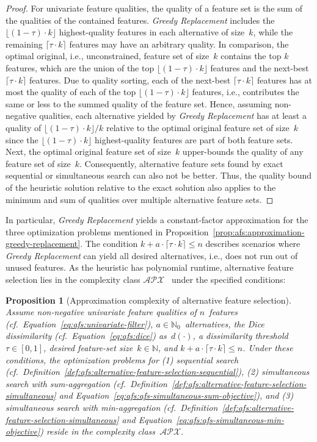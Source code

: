 \documentclass{article}
\newtheorem{proposition}{Proposition}
\theoremstyle{definition}
\begin{document}
%
\begin{proof}
	For univariate feature qualities, the quality of a feature set is the sum of the qualities of the contained features.
	\emph{Greedy Replacement} includes the $\lfloor (1 - \tau) \cdot k \rfloor$ highest-quality features in each alternative of size~$k$, while the remaining $\lceil \tau \cdot k \rceil$ features may have an arbitrary quality.
	In comparison, the optimal original, i.e., unconstrained, feature set of size~$k$ contains the top $k$ features, which are the union of the top $\lfloor (1 - \tau) \cdot k \rfloor$ features and the next-best $\lceil \tau \cdot k \rceil$ features.
	Due to quality sorting, each of the next-best $\lceil \tau \cdot k \rceil$ features has at most the quality of each of the top $\lfloor (1 - \tau) \cdot k \rfloor$ features, i.e., contributes the same or less to the summed quality of the feature set.
	Hence, assuming non-negative qualities, each alternative yielded by \emph{Greedy Replacement} has at least a quality of $\lfloor (1 - \tau) \cdot k \rfloor / k$ relative to the optimal original feature set of size~$k$ since the $\lfloor (1 - \tau) \cdot k \rfloor$ highest-quality features are part of both feature sets.
	Next, the optimal original feature set of size~$k$ upper-bounds the quality of any feature set of size~$k$.
	Consequently, alternative feature sets found by exact sequential or simultaneous search can also not be better.
	Thus, the quality bound of the heuristic solution relative to the exact solution also applies to the minimum and sum of qualities over multiple alternative feature sets.
\end{proof}
%
In particular, \emph{Greedy Replacement} yields a constant-factor approximation for the three optimization problems mentioned in Proposition~\ref{prop:afs:approximation-greedy-replacement}.
The condition $k + a \cdot \lceil \tau \cdot k \rceil \leq n$ describes scenarios where \emph{Greedy Replacement} can yield all desired alternatives, i.e., does not run out of unused features.
As the heuristic has polynomial runtime, alternative feature selection lies in the complexity class $\mathcal{APX}$~\cite{khanna1998syntactic} under the specified conditions:
%
\begin{proposition}[Approximation complexity of alternative feature selection]
	Assume non-negative univariate feature qualities of $n$~features (cf.~Equation~\ref{eq:afs:univariate-filter}), $a \in \mathbb{N}_0$~alternatives, the Dice dissimilarity (cf.~Equation~\ref{eq:afs:dice}) as~$d(\cdot)$, a dissimilarity threshold~$\tau \in [0,1]$, desired feature-set size~$k \in \mathbb{N}$, and $k + a \cdot \lceil \tau \cdot k \rceil \leq n$.
	Under these conditions, the optimization problems for (1) sequential search (cf.~Definition~\ref{def:afs:alternative-feature-selection-sequential}), (2) simultaneous search with sum-aggregation (cf.~Definition~\ref{def:afs:alternative-feature-selection-simultaneous} and Equation~\ref{eq:afs:afs-simultaneous-sum-objective}), and (3) simultaneous search with min-aggregation (cf.~Definition~\ref{def:afs:alternative-feature-selection-simultaneous} and Equation~\ref{eq:afs:afs-simultaneous-min-objective}) reside in the complexity class~$\mathcal{APX}$.
	\label{prop:afs:approximation-apx}
\end{proposition}
\end{document}
